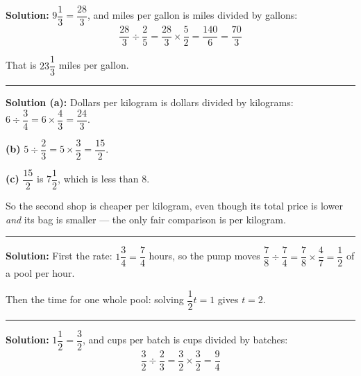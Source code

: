 \documentclass[12pt]{article}
\begin{document}
\textbf{Solution:} $9\dfrac{1}{3} = \dfrac{28}{3}$, and miles per gallon is miles divided by gallons:
\[ \frac{28}{3} \div \frac{2}{5} = \frac{28}{3} \times \frac{5}{2} = \frac{140}{6} = \frac{70}{3} \]

That is $23\dfrac{1}{3}$ miles per gallon.

\vspace{0.15cm}\noindent\rule{\linewidth}{0.2pt}\vspace{0.15cm}


\textbf{Solution (a):} Dollars per kilogram is dollars divided by kilograms: $6 \div \dfrac{3}{4} = 6 \times \dfrac{4}{3} = \dfrac{24}{3}$. 

\textbf{(b)} $5 \div \dfrac{2}{3} = 5 \times \dfrac{3}{2} = \dfrac{15}{2}$. 

\textbf{(c)} $\dfrac{15}{2}$ is $7\dfrac{1}{2}$, which is less than 8. 

So the second shop is cheaper per kilogram, even though its total price is lower \emph{and} its bag is smaller --- the only fair comparison is per kilogram.

\vspace{0.15cm}\noindent\rule{\linewidth}{0.2pt}\vspace{0.15cm}


\textbf{Solution:} First the rate: $1\dfrac{3}{4} = \dfrac{7}{4}$ hours, so the pump moves $\dfrac{7}{8} \div \dfrac{7}{4} = \dfrac{7}{8} \times \dfrac{4}{7} = \dfrac{1}{2}$ of a pool per hour.

Then the time for one whole pool: solving $\dfrac{1}{2}t = 1$ gives $t = 2$. 

\vspace{0.15cm}\noindent\rule{\linewidth}{0.2pt}\vspace{0.15cm}


\textbf{Solution:} $1\dfrac{1}{2} = \dfrac{3}{2}$, and cups per batch is cups divided by batches:
\[ \frac{3}{2} \div \frac{2}{3} = \frac{3}{2} \times \frac{3}{2} = \frac{9}{4} \]
\end{document}
